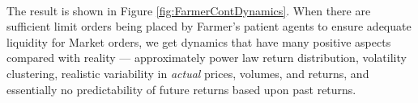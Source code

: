 \documentclass[runningheads]{llncs}
\begin{document}
\paragraph*{}
The result is shown in Figure \ref{fig:FarmerContDynamics}. When there are sufficient limit orders being placed by Farmer's patient agents to ensure adequate liquidity for Market orders, we get dynamics that have many positive aspects compared with reality --- approximately power law return distribution, volatility clustering, realistic variability in \emph{actual} prices, volumes, and returns, and essentially no predictability of future returns based upon past returns.

\begin{figure}[htbp]
  \begin{center}
   \mbox{
      \quad
       \quad
}
\end{center}
\end{figure}
\end{document}
